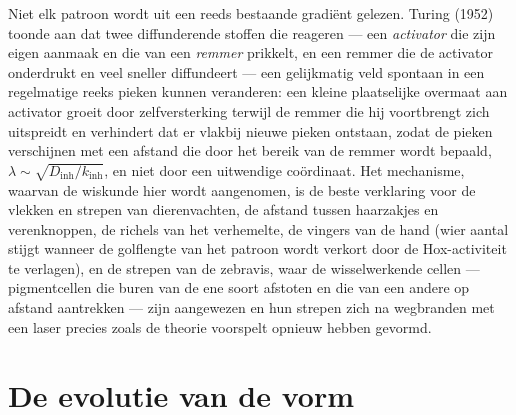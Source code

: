 \begin{proposition}\label{prop:b3:developmental-genetics:turing}
Niet elk patroon wordt uit een reeds bestaande gradiënt gelezen. Turing
(1952) toonde aan dat twee diffunderende stoffen die reageren --- een
\emph{activator} die zijn eigen aanmaak en die van een \emph{remmer}
prikkelt, en een remmer die de activator onderdrukt en veel sneller
diffundeert --- een gelijkmatig veld spontaan in een regelmatige reeks
pieken kunnen veranderen: een kleine plaatselijke overmaat aan
activator groeit door zelfversterking terwijl de remmer die hij
voortbrengt zich uitspreidt en verhindert dat er vlakbij nieuwe pieken
ontstaan, zodat de pieken verschijnen met een afstand die door het
bereik van de remmer wordt bepaald,
$\lambda \sim \sqrt{D_{\text{inh}}/k_{\text{inh}}}$, en niet door een
uitwendige coördinaat. Het mechanisme, waarvan de wiskunde hier wordt
aangenomen, is de beste verklaring voor de vlekken en strepen van
dierenvachten, de afstand tussen haarzakjes en verenknoppen, de richels
van het verhemelte, de vingers van de hand (wier aantal stijgt wanneer
de golflengte van het patroon wordt verkort door de Hox-activiteit te
verlagen), en de strepen van de zebravis, waar de wisselwerkende cellen
--- pigmentcellen die buren van de ene soort afstoten en die van een
andere op afstand aantrekken --- zijn aangewezen en hun strepen zich na
wegbranden met een laser precies zoals de theorie voorspelt opnieuw
hebben gevormd.
\end{proposition}
\admitted

\section{De evolutie van de vorm}

